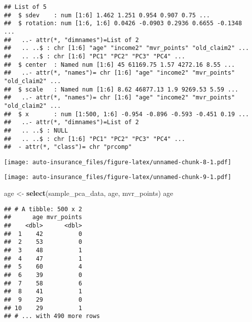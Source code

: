 \documentclass[]{article}
\newenvironment{Shaded}{\begin{snugshade}}{\end{snugshade}}
\newcommand{\KeywordTok}[1]{\textcolor[rgb]{0.13,0.29,0.53}{\textbf{#1}}}
\newcommand{\DataTypeTok}[1]{\textcolor[rgb]{0.13,0.29,0.53}{#1}}
\newcommand{\StringTok}[1]{\textcolor[rgb]{0.31,0.60,0.02}{#1}}
\newcommand{\OtherTok}[1]{\textcolor[rgb]{0.56,0.35,0.01}{#1}}
\newcommand{\OperatorTok}[1]{\textcolor[rgb]{0.81,0.36,0.00}{\textbf{#1}}}
\newcommand{\NormalTok}[1]{#1}
\begin{document}
\begin{verbatim}
## List of 5
##  $ sdev    : num [1:6] 1.462 1.251 0.954 0.907 0.75 ...
##  $ rotation: num [1:6, 1:6] 0.0426 -0.0903 0.2936 0.6655 -0.1348 ...
##   ..- attr(*, "dimnames")=List of 2
##   .. ..$ : chr [1:6] "age" "income2" "mvr_points" "old_claim2" ...
##   .. ..$ : chr [1:6] "PC1" "PC2" "PC3" "PC4" ...
##  $ center  : Named num [1:6] 45 61169.75 1.57 4272.16 8.55 ...
##   ..- attr(*, "names")= chr [1:6] "age" "income2" "mvr_points" "old_claim2" ...
##  $ scale   : Named num [1:6] 8.62 46877.13 1.9 9269.53 5.59 ...
##   ..- attr(*, "names")= chr [1:6] "age" "income2" "mvr_points" "old_claim2" ...
##  $ x       : num [1:500, 1:6] -0.954 -0.896 -0.593 -0.451 0.19 ...
##   ..- attr(*, "dimnames")=List of 2
##   .. ..$ : NULL
##   .. ..$ : chr [1:6] "PC1" "PC2" "PC3" "PC4" ...
##  - attr(*, "class")= chr "prcomp"
\end{verbatim}

\begin{Shaded}
\end{Shaded}

\texttt{[image: auto-insurance\_files/figure-latex/unnamed-chunk-8-1.pdf]}

\begin{Shaded}
\end{Shaded}

\texttt{[image: auto-insurance\_files/figure-latex/unnamed-chunk-9-1.pdf]}

\begin{Shaded}
\begin{Highlighting}[]
\NormalTok{age <-}\StringTok{ }\KeywordTok{select}\NormalTok{(sample_pca_data, age, mvr_points)}
\NormalTok{age}
\end{Highlighting}
\end{Shaded}

\begin{verbatim}
## # A tibble: 500 x 2
##      age mvr_points
##    <dbl>      <dbl>
##  1    42          0
##  2    53          0
##  3    48          1
##  4    47          1
##  5    60          4
##  6    39          0
##  7    58          6
##  8    41          1
##  9    29          0
## 10    29          1
## # ... with 490 more rows
\end{verbatim}
\end{document}
